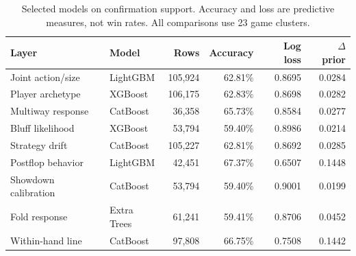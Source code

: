 \begin{table}[htbp]
\centering\small
\caption{Selected models on confirmation support. Accuracy and loss are predictive measures, not win rates. All comparisons use 23 game clusters.}
\label{tab:layers}
\begin{tabular}{llrrrr}
\toprule
Layer & Model & Rows & Accuracy & Log loss & $\Delta$ prior \\
\midrule
Joint action/size & LightGBM & 105,924 & 62.81\% & 0.8695 & 0.0284 \\
Player archetype & XGBoost & 106,175 & 62.83\% & 0.8698 & 0.0282 \\
Multiway response & CatBoost & 36,358 & 65.73\% & 0.8584 & 0.0277 \\
Bluff likelihood & XGBoost & 53,794 & 59.40\% & 0.8986 & 0.0214 \\
Strategy drift & CatBoost & 105,227 & 62.81\% & 0.8692 & 0.0285 \\
Postflop behavior & LightGBM & 42,451 & 67.37\% & 0.6507 & 0.1448 \\
Showdown calibration & CatBoost & 53,794 & 59.40\% & 0.9001 & 0.0199 \\
Fold response & Extra Trees & 61,241 & 59.41\% & 0.8706 & 0.0452 \\
Within-hand line & CatBoost & 97,808 & 66.75\% & 0.7508 & 0.1442 \\
\bottomrule
\end{tabular}
\end{table}
